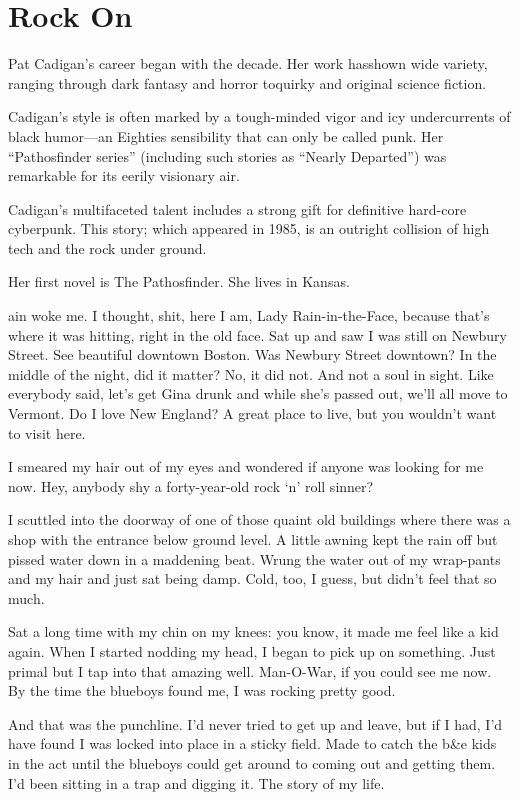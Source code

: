 \chapter{Rock On}

Pat Cadigan's career began with the decade. Her work hasshown wide variety, ranging through dark fantasy and horror toquirky and original science fiction.

Cadigan's style is often marked by a tough-minded vigor and icy undercurrents of black humor—an Eighties sensibility that can only be called punk. Her ``Pathosfinder series'' (including such stories as ``Nearly Departed'') was remarkable for its eerily visionary air.

Cadigan's multifaceted talent includes a strong gift for definitive hard-core cyberpunk. This story; which appeared in 1985, is an outright collision of high tech and the rock under ground.

Her first novel is The Pathosfinder. She lives in Kansas.

\hrulefill

ain woke me. I thought, shit, here I am, Lady Rain-in-the-Face, because that's where it was hitting, right in the old face. Sat up and saw I was still on Newbury Street. See beautiful downtown Boston. Was Newbury Street downtown? In the middle of the night, did it matter? No, it did not. And not a soul in sight. Like everybody said, let's get Gina drunk and while she's passed out, we'll all move to Vermont. Do I love New England? A great place to live, but you wouldn't want to visit here.

I smeared my hair out of my eyes and wondered if anyone was looking for me now. Hey, anybody shy a forty-year-old rock `n' roll sinner?

I scuttled into the doorway of one of those quaint old buildings where there was a shop with the entrance below ground level. A little awning kept the rain off but pissed water down in a maddening beat. Wrung the water out of my wrap-pants and my hair and just sat being damp. Cold, too, I guess, but didn't feel that so much.

Sat a long time with my chin on my knees: you know, it made me feel like a kid again. When I started nodding my head, I began to pick up on something. Just primal but I tap into that amazing well. Man-O-War, if you could see me now. By the time the blueboys found me, I was rocking pretty good.

And that was the punchline. I'd never tried to get up and leave, but if I had, I'd have found I was locked into place in a sticky field. Made to catch the b\&e kids in the act until the blueboys could get around to coming out and getting them. I'd been sitting in a trap and digging it. The story of my life.


